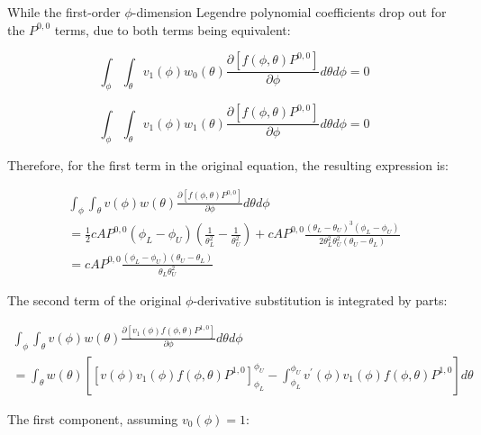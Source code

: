 \documentclass[12pt,a4paper,pagesize=pdftex]{scrartcl}
\begin{document}
While the first-order \(\phi\)-dimension Legendre polynomial coefficients drop out for the \(P^{0,0}\) terms, due to both terms being equivalent:

\begin{equation*}
    \int_\phi \int_\theta v_1\left(\phi\right) w_0\left(\theta\right) \frac{\partial \left[f\left(\phi, \theta\right) P^{0,0}\right]}{\partial \phi} d\theta d\phi = 0
\end{equation*}

\begin{equation*}
    \int_\phi \int_\theta v_{1}\left(\phi\right) w_1\left(\theta\right) \frac{\partial \left[f\left(\phi, \theta\right) P^{0,0}\right]}{\partial \phi} d\theta d\phi = 0
\end{equation*}

Therefore, for the first term in the original equation, the resulting expression is:

\begin{multline*}
    \int_\phi \int_\theta v\left(\phi\right) w\left(\theta\right) \frac{\partial\left[f\left(\phi, \theta\right) P^{0,0}\right]}{\partial \phi} d\theta d\phi \\
    = \frac{1}{2} c A P^{0,0} \left(\phi_L - \phi_U\right) \left(\frac{1}{\theta_L^2} - \frac{1}{\theta_U^2}\right) + c A P^{0,0} \frac{\left(\theta_L - \theta_U\right)^3\left(\phi_L - \phi_U\right)}{2 \theta_L^2 \theta_U^2 \left(\theta_U - \theta_L\right)} \\
    = \boxed{c A P^{0,0} \frac{\left(\phi_L - \phi_U\right) \left(\theta_U - \theta_L\right)}{\theta_L \theta_U^2}}
\end{multline*}

The second term of the original \(\phi\)-derivative substitution is integrated by parts:

\begin{multline*}
    \int_\phi \int_\theta v\left(\phi\right) w\left(\theta\right) \frac{\partial \left[v_1\left(\phi\right) f\left(\phi, \theta\right) P^{1,0}\right]}{\partial \phi} d\theta d\phi \\
    = \int_\theta w\left(\theta\right) \left[ \left[v\left(\phi\right) v_1\left(\phi\right) f\left(\phi, \theta\right) P^{1,0}\right]_{\phi_L}^{\phi_U} - \int_{\phi_L}^{\phi_U} v^\prime\left(\phi\right) v_1\left(\phi\right) f\left(\phi, \theta\right) P^{1,0} \right] d\theta
\end{multline*}

The first component, assuming \(v_0\left(\phi\right) = 1\):
\end{document}
